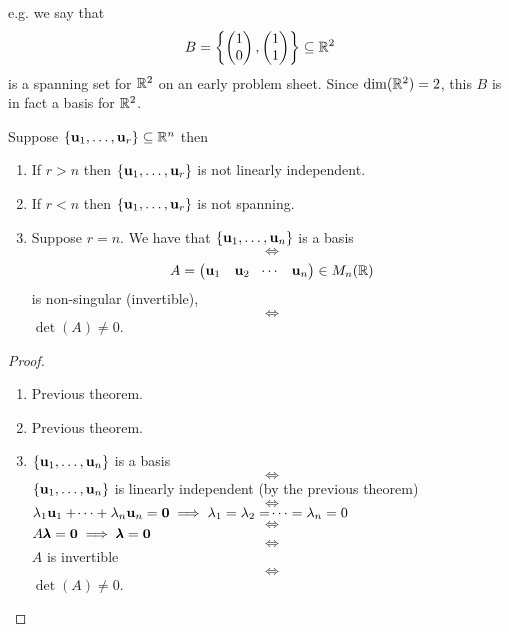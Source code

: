 \documentclass[10pt, a4paper]{article}
\begin{document}
e.g. we say that
\[
B = \left\{\begin{pmatrix}
    1 \\ 0
\end{pmatrix},
\begin{pmatrix}
    1 \\ 1
\end{pmatrix}\right\} \subseteq \mathbb{R} ^ 2
\]
is a spanning set for $\mathbb{R} ^ 2$ on an early problem sheet.
Since $\dim(\mathbb{R} ^ 2) = 2$,
this $B$ is in fact a basis for $\mathbb{R} ^ 2$.

\begin{theorem}
    Suppose $\{\mathbf{u}_1, \dotsc, \mathbf{u}_r\} \subseteq \mathbb{R} ^ n$ then
    \begin{enumerate}[label = (\roman*)]
        \item If $r > n$ then $\{\mathbf{u}_1, \dotsc, \mathbf{u}_r\}$ is not linearly independent.
        \item If $r < n$ then $\{\mathbf{u}_1, \dotsc, \mathbf{u}_r\}$ is not spanning.
        \item Suppose $r = n$.
        We have that $\{\mathbf{u}_1, \dotsc, \mathbf{u}_n\}$ is a basis
        \[
        \iff
        \]
        \[
        A = \begin{pmatrix}
            \mathbf{u}_1 & \mathbf{u}_2 & \dotsi & \mathbf{u}_n
        \end{pmatrix} \in M_n(\mathbb{R})
        \]
        is non-singular
        (invertible),
        \[
        \iff
        \]
        $\det(A) \neq 0$.
    \end{enumerate}
    \begin{proof}\phantom{}
        \begin{enumerate}[label = (\roman*)]
            \item Previous theorem.
            \item Previous theorem.
            \item
            \centering
            $\{\mathbf{u}_1, \dotsc, \mathbf{u}_n\}$ is a basis
            \[
            \iff
            \]
            $\{\mathbf{u}_1, \dotsc, \mathbf{u}_n\}$ is linearly independent
            (by the previous theorem)
            \[
            \iff
            \]
            $\lambda_1\mathbf{u}_1 + \dotsi + \lambda_n\mathbf{u}_n = \mathbf{0} \implies \lambda_1 = \lambda_2 = \dotsi = \lambda_n = 0$
            \[
            \iff
            \]
            $A\pmb{\lambda} = \mathbf{0} \implies \pmb{\lambda} = \mathbf{0}$
            \[
            \iff
            \]
            $A$ is invertible
            \[
            \iff
            \]
            $\det(A) \neq 0$.
        \end{enumerate}
    \end{proof}
\end{theorem}
\end{document}
